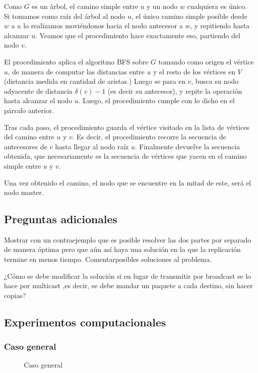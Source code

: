 \documentclass[a4paper, 10pt, twoside]{article}
\newcommand{\dosgraficos}[2]{
    \newcommand{\separacion}{-2.2em}
    \vspace{\separacion}
    
    \vspace{\separacion}
    
}
\begin{document}
Como $G$ es un árbol, el camino simple entre $u$ y un nodo $w$ cualquiera es único. Si tomamos como raíz del árbol al nodo $u$, el único camino simple posible desde $w$ a $u$ lo realizamos moviéndonos hacia el nodo antecesor a $w$, y repitiendo hasta alcanzar $u$. Veamos que el procedimiento hace exactamente eso, partiendo del nodo $v$.

El procedimiento aplica el algoritmo BFS sobre $G$ tomando como origen el vértice $u$, de manera de computar las distancias entre $u$ y el resto de los vértices en $V$ (distancia medida en cantidad de aristas.) Luego se para en $v$, busca su nodo adyacente de distancia $\delta(v) - 1$ (es decir su antecesor), y repite la operación hasta alcanzar el nodo $u$. Luego, el procedimiento cumple con lo dicho en el párrafo anterior.

Tras cada paso, el procedimiento guarda el vértice visitado en la lista de vértices del camino entre $u$ y $v$. Es decir, el procedimiento recorre la secuencia de antecesores de $v$ hasta llegar al nodo raíz $u$. Finalmente devuelve la secuencia obtenida, que necesariamente es la secuencia de vértices que yacen en el camino simple entre $u$ y $v$.

Una vez obtenido el camino, el nodo que se encuentre en la mitad de este, será el nodo master.


\subsection{Preguntas adicionales}

Mostrar con un contraejemplo que es posible resolver las dos partes por separado de manera óptima pero que aún así haya una solución en la que la replicación termine en menos tiempo. Comentarposibles soluciones al problema.


¿Cómo se debe modificar la solución si en lugar de transmitir por broadcast se lo hace por
multicast ,es decir, se debe mandar un paquete a cada destino, sin hacer copias?


\subsection{Experimentos computacionales}


\subsubsection{Caso general}

\begin{figure}[H]
  \centering
  \dosgraficos{problema2-caso-general}
              {problema2-caso-general-n}
  \caption{Caso general}
\end{figure}
\end{document}
